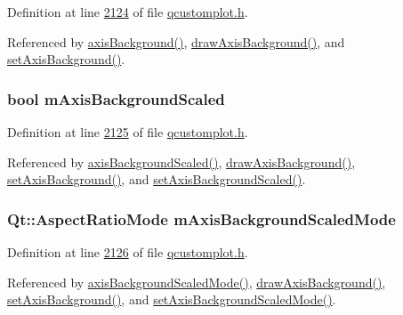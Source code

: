Definition at line \hyperlink{a00116_source_l02124}{2124} of file \hyperlink{a00116_source}{qcustomplot.\+h}.



Referenced by \hyperlink{a00116_source_l01972}{axis\+Background()}, \hyperlink{a00115_source_l08090}{draw\+Axis\+Background()}, and \hyperlink{a00115_source_l06222}{set\+Axis\+Background()}.

\hypertarget{a00116_aa02865bc98b010e95c3aab39a3439ed0}{
\subsubsection[{m\+Axis\+Background\+Scaled}]{\setlength{\rightskip}{0pt plus 5cm}bool m\+Axis\+Background\+Scaled}}\label{a00116_aa02865bc98b010e95c3aab39a3439ed0}


Definition at line \hyperlink{a00116_source_l02125}{2125} of file \hyperlink{a00116_source}{qcustomplot.\+h}.



Referenced by \hyperlink{a00116_source_l01973}{axis\+Background\+Scaled()}, \hyperlink{a00115_source_l08090}{draw\+Axis\+Background()}, \hyperlink{a00115_source_l06233}{set\+Axis\+Background()}, and \hyperlink{a00115_source_l06252}{set\+Axis\+Background\+Scaled()}.

\hypertarget{a00116_a513c32c470438510a3341295b0ead04a}{
\subsubsection[{m\+Axis\+Background\+Scaled\+Mode}]{\setlength{\rightskip}{0pt plus 5cm}Qt\+::\+Aspect\+Ratio\+Mode m\+Axis\+Background\+Scaled\+Mode}}\label{a00116_a513c32c470438510a3341295b0ead04a}


Definition at line \hyperlink{a00116_source_l02126}{2126} of file \hyperlink{a00116_source}{qcustomplot.\+h}.



Referenced by \hyperlink{a00116_source_l01974}{axis\+Background\+Scaled\+Mode()}, \hyperlink{a00115_source_l08090}{draw\+Axis\+Background()}, \hyperlink{a00115_source_l06233}{set\+Axis\+Background()}, and \hyperlink{a00115_source_l06262}{set\+Axis\+Background\+Scaled\+Mode()}.

